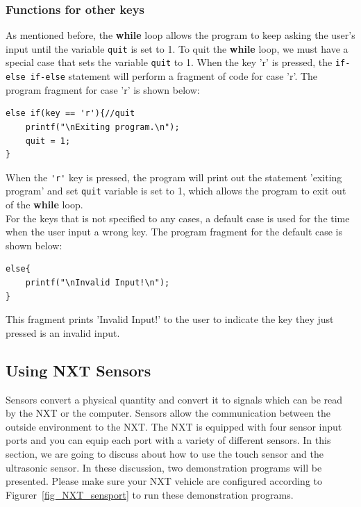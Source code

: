 \documentclass[11pt]{article}
\begin{document}
\subsubsection*{Functions for other keys}
As mentioned before, the {\bf while} loop allows the program to keep asking the user's input until the variable
\verb+quit+ is set to 1. To quit the {\bf while} loop, we must have a special case that sets the variable \verb+quit+ to 1.
When the key 'r' is pressed, the \verb+if-else if-else+ statement will perform a fragment of code for case 'r'.
The program fragment for case 'r' is shown below:
\begin{lstlisting}
else if(key == 'r'){//quit
    printf("\nExiting program.\n");
    quit = 1;
}
\end{lstlisting}
When the \verb+'r'+ key is pressed, the program will print out the statement 'exiting program' and set \verb+quit+
variable is set to 1, which allows the program to exit out of the {\bf while} loop.\\
\newline
For the keys that is not specified to any cases, a default case is used for the 
time when the user input a wrong key. The program fragment for the default case 
is shown below:
\begin{lstlisting}
else{
    printf("\nInvalid Input!\n");
}
\end{lstlisting}

This fragment prints 'Invalid Input!' to the user to indicate the key they just pressed is an invalid input.

\subsection{Using NXT Sensors}
Sensors convert a physical quantity and convert it to signals which can be read by the NXT or the computer. 
Sensors allow the communication between the outside environment to the NXT. The NXT is equipped with four 
sensor input ports and you can equip each port with a variety of different sensors. In this section, we are 
going to discuss about how to use the touch sensor and the ultrasonic sensor. In these discussion, two 
demonstration programs will be presented. Please make sure your NXT vehicle are configured according to 
Figurer~\ref{fig_NXT_sensport} to run these demonstration programs.
\end{document}
